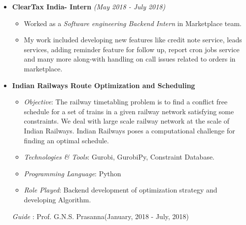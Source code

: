 \documentclass[10pt]{article}
\newcommand{\shadethis}[1]{ \begin{snugshade}#1\end{snugshade}}
\begin{document}
\begin{description}[style=nextline]
            \begin{itemize}
                    \item \textbf{ ClearTax India- Intern} \emph{(May 2018 - July 2018)}
                    \begin{itemize}
                        \item Worked as a \emph{Software engineering Backend Intern} in Marketplace team.
                        \item My work included developing new features like credit note service, leads services, adding reminder feature for follow up, report cron jobs service and many more along-with handling on call issues related to orders in marketplace.
                        
                    \end{itemize}
    \end{itemize}
        
        \shadethis{\item{}}
        
                
            \begin{itemize}
                
                    \item \textbf{Indian Railways Route Optimization and Scheduling }
                    \begin{itemize}
                        \item \emph{Objective}: The railway timetabling problem is to find a conflict free schedule for a set of trains in a given railway network satisfying some constraints. We deal with large scale railway network at the scale of Indian Railways. Indian Railways poses a computational challenge for finding an optimal schedule.

                        \item \emph{Technologies \& Tools}: Gurobi, GurobiPy, Constraint Database.
                        \item \emph{Programming Language}:  Python
                            \item \emph{Role Played}: Backend 
development of optimization strategy and developing Algorithm.

                    \end{itemize}
                                
                    {\emph{Guide} : Prof. G.N.S. Prasanna}\hfill(January, 2018 - July, 2018)
                

\end{itemize}
\end{description}
\end{document}
